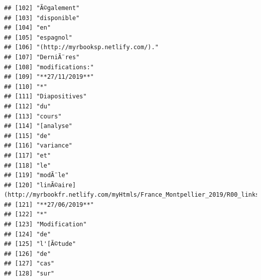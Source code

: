 \documentclass[]{book}
\begin{document}
\begin{verbatim}
## [102] "Ã©galement"                                                                             
## [103] "disponible"                                                                             
## [104] "en"                                                                                     
## [105] "espagnol"                                                                               
## [106] "(http://myrbooksp.netlify.com/)."                                                       
## [107] "DerniÃ¨res"                                                                             
## [108] "modifications:"                                                                         
## [109] "**27/11/2019**"                                                                         
## [110] "*"                                                                                      
## [111] "Diapositives"                                                                           
## [112] "du"                                                                                     
## [113] "cours"                                                                                  
## [114] "[analyse"                                                                               
## [115] "de"                                                                                     
## [116] "variance"                                                                               
## [117] "et"                                                                                     
## [118] "le"                                                                                     
## [119] "modÃ¨le"                                                                                
## [120] "linÃ©aire](http://myrbookfr.netlify.com/myHtmls/France_Montpellier_2019/R00_links.html)"
## [121] "**27/06/2019**"                                                                         
## [122] "*"                                                                                      
## [123] "Modification"                                                                           
## [124] "de"                                                                                     
## [125] "l'[Ã©tude"                                                                              
## [126] "de"                                                                                     
## [127] "cas"                                                                                    
## [128] "sur"                                                                                    

\end{verbatim}
\end{document}
